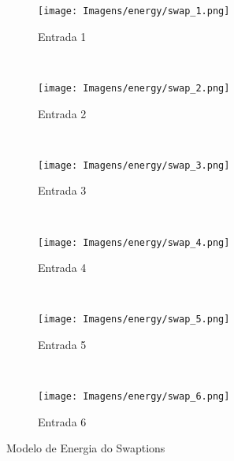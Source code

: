 \begin{figure}[H]
    \centering
    \begin{subfigure}[t]{0.5\textwidth}
        \centering
        \texttt{[image: Imagens/energy/swap\_1.png]}
        \caption{Entrada 1}
    \end{subfigure}%
    ~ 
    \begin{subfigure}[t]{0.5\textwidth}
        \centering
        \texttt{[image: Imagens/energy/swap\_2.png]}
        \caption{Entrada 2}
    \end{subfigure}
    \\
    \centering
    \begin{subfigure}[t]{0.5\textwidth}
        \centering
        \texttt{[image: Imagens/energy/swap\_3.png]}
        \caption{Entrada 3}
    \end{subfigure}%
    ~ 
    \begin{subfigure}[t]{0.5\textwidth}
        \centering
        \texttt{[image: Imagens/energy/swap\_4.png]}
        \caption{Entrada 4}
    \end{subfigure}
    \\
    \centering
    \begin{subfigure}[t]{0.5\textwidth}
        \centering
        \texttt{[image: Imagens/energy/swap\_5.png]}
        \caption{Entrada 5}
    \end{subfigure}%
    ~ 
    \begin{subfigure}[t]{0.5\textwidth}
        \centering
        \texttt{[image: Imagens/energy/swap\_6.png]}
        \caption{Entrada 6}
    \end{subfigure}
    
    \caption{Modelo de Energia do Swaptions}
    \label{fig:energia_swaptions}
\end{figure}

